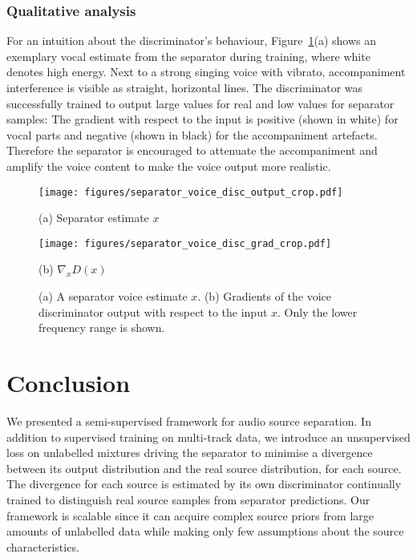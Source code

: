 \documentclass{article}
\begin{document}
\subsubsection{Qualitative analysis}
For an intuition about the discriminator's behaviour, Figure~\ref{fig:discriminator}(a) shows an exemplary vocal estimate from the separator during training, where white denotes high energy.
Next to a strong singing voice with vibrato, accompaniment interference is visible as straight, horizontal lines.
The discriminator was successfully trained to output large values for real and low values for separator samples:
The gradient with respect to the input is positive (shown in white) for vocal parts and negative (shown in black) for the accompaniment artefacts.
Therefore the separator is encouraged to attenuate the accompaniment and amplify the voice content to make the voice output more realistic.

\begin{figure}[t]
\begin{minipage}[l]{0.48\linewidth}
  \centering
  \centerline{\texttt{[image: figures/separator\_voice\_disc\_output\_crop.pdf]}}
  \centerline{(a) Separator estimate $x$}\medskip
\end{minipage}
%
\begin{minipage}[r]{0.48\linewidth}
  \centering
  \centerline{\texttt{[image: figures/separator\_voice\_disc\_grad\_crop.pdf]}}
  \centerline{(b) $\nabla_x D(x)$}\medskip
\end{minipage}
%
\caption{(a) A separator voice estimate $x$. (b) Gradients of the voice discriminator output with respect to the input $x$. Only the lower frequency range is shown.}
\label{fig:discriminator}
%
\end{figure}

\section{Conclusion}
\label{sec:conclusion}

We presented a semi-supervised framework for audio source separation.
In addition to supervised training on multi-track data, we introduce an unsupervised loss on unlabelled mixtures driving the separator to minimise a divergence between its output distribution and the real source distribution, for each source.
The divergence for each source is estimated by its own discriminator continually trained to distinguish real source samples from separator predictions. 
Our framework is scalable since it can acquire complex source priors from large amounts of unlabelled data while making only few assumptions about the source characteristics.
\end{document}
